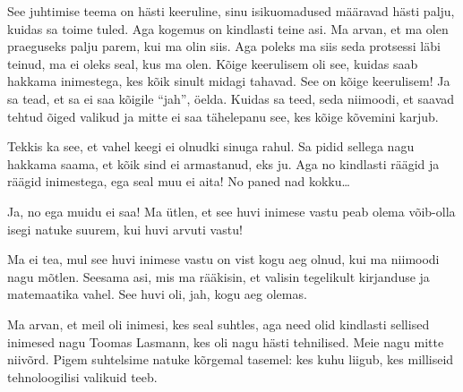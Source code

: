 See juhtimise teema on hästi keeruline, sinu isikuomadused määravad hästi 
palju, kuidas sa toime tuled. Aga kogemus on kindlasti teine asi. Ma arvan, et 
ma olen praeguseks palju parem, kui ma olin siis. Aga poleks ma siis seda 
protsessi läbi teinud,  ma ei oleks seal, kus ma olen. Kõige keerulisem oli 
see, kuidas saab hakkama inimestega, kes kõik sinult midagi tahavad. See  on 
kõige keerulisem! Ja sa tead, et sa ei saa kõigile \enquote{jah}, öelda. Kuidas 
sa teed, seda niimoodi, et saavad tehtud õiged valikud ja mitte ei saa 
tähelepanu see, kes kõige kõvemini karjub. 


Tekkis ka see, et vahel keegi ei olnudki sinuga rahul. Sa pidid sellega nagu 
hakkama saama, et kõik sind ei armastanud, eks ju. Aga no kindlasti räägid ja 
räägid inimestega, ega seal muu ei aita! No paned nad kokku\ldots


Ja, no ega muidu ei saa! Ma ütlen, et see huvi inimese vastu peab olema 
võib-olla isegi natuke suurem, kui huvi arvuti vastu! 


Ma ei tea, mul see huvi inimese vastu on vist kogu aeg olnud, kui ma niimoodi 
nagu mõtlen. Seesama asi, mis ma rääkisin, et valisin tegelikult kirjanduse ja 
matemaatika vahel. See huvi oli, jah, kogu aeg olemas. 


Ma arvan, et meil oli inimesi, kes  seal suhtles, aga need olid kindlasti 
sellised inimesed nagu Toomas Lasmann, kes oli 
nagu hästi tehnilised. Meie nagu mitte niivõrd. Pigem suhtelsime natuke 
kõrgemal tasemel: kes kuhu liigub, kes milliseid tehnoloogilisi valikuid teeb.


